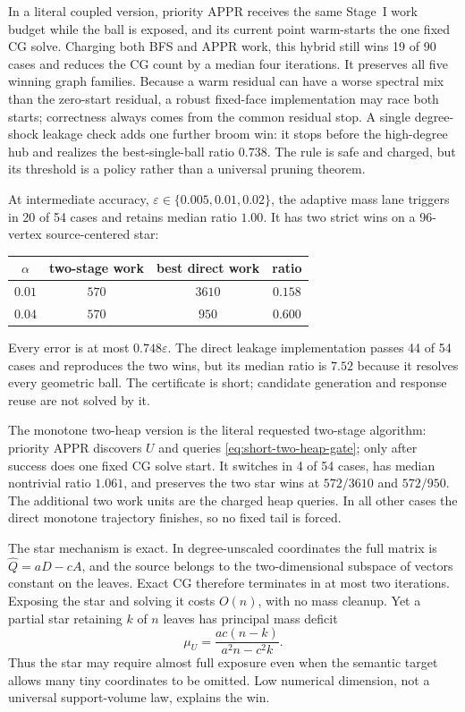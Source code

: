 In a literal coupled version, priority APPR receives the same Stage~I work
budget while the ball is exposed, and its current point warm-starts the one
fixed CG solve.  Charging both BFS and APPR work, this hybrid still wins 19 of
90 cases and reduces the CG count by a median four iterations.  It preserves
all five winning graph families.  Because a warm residual can have a worse
spectral mix than the zero-start residual, a robust fixed-face implementation
may race both starts; correctness always comes from the common residual stop.
A single degree-shock leakage check adds one further broom win: it stops
before the high-degree hub and realizes the best-single-ball ratio $0.738$.
The rule is safe and charged, but its threshold is a policy rather than a
universal pruning theorem.

At intermediate accuracy,
$\varepsilon\in\{0.005,0.01,0.02\}$, the adaptive mass
lane triggers in 20 of 54 cases and retains median ratio $1.00$.  It has two
strict wins on a 96-vertex source-centered star:
\begin{center}
\small
\begin{tabular}{@{}cccc@{}}
\toprule
$\alpha$ & two-stage work & best direct work & ratio \\
\midrule
$0.01$ & $570$ & $3610$ & $0.158$ \\
$0.04$ & $570$ & $950$ & $0.600$ \\
\bottomrule
\end{tabular}
\end{center}
Every error is at most $0.748\varepsilon$.  The direct leakage implementation
passes 44 of 54 cases and reproduces the two wins, but its median ratio is
$7.52$ because it resolves every geometric ball.  The certificate is short;
candidate generation and response reuse are not solved by it.

The monotone two-heap version is the literal requested two-stage algorithm:
priority APPR discovers $U$ and queries \cref{eq:short-two-heap-gate}; only
after success does one fixed CG solve start.  It switches in 4 of 54 cases,
has median nontrivial ratio $1.061$, and preserves the two star wins at
$572/3610$ and $572/950$.  The additional two work units are the charged heap
queries.  In all other cases the direct monotone trajectory finishes, so no
fixed tail is forced.

The star mechanism is exact.  In degree-unscaled coordinates the full matrix
is $\widehat Q=aD-cA$, and the source belongs to the two-dimensional subspace
of vectors constant on the leaves.  Exact CG therefore terminates in at most
two iterations.  Exposing the star and solving it costs $O(n)$, with no mass
cleanup.  Yet a partial star retaining $k$ of $n$ leaves has principal mass
deficit
\begin{equation}
 \mu_U=\frac{ac(n-k)}{a^2n-c^2k}.
 \label{eq:short-star-deficit}
\end{equation}
Thus the star may require almost full exposure even when the semantic target
allows many tiny coordinates to be omitted.  Low numerical dimension, not a
universal support-volume law, explains the win.

